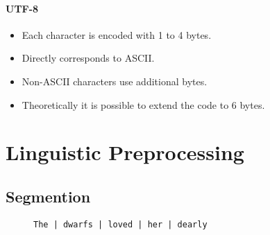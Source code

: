             \subsubsection{UTF-8} %
                \begin{itemize}
                	\item Each character is encoded with 1 to 4 bytes.
                	\item Directly corresponds to ASCII.
                	\item Non-ASCII characters use additional bytes.
                	\item Theoretically it is possible to extend the code to 6 bytes.
                \end{itemize}

\chapter{Linguistic Preprocessing} %
	\label{c:linguisticpreprocessing}

    \section{Segmention} %
    	\begin{figure}[H]
    		\centering
    		\texttt{The | dwarfs | loved | her | dearly}
    	\end{figure}

